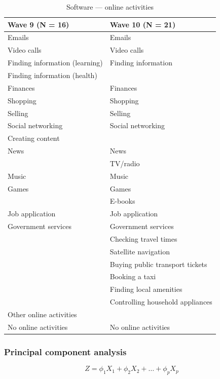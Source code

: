\begin{table}[h!]
    \centering
    \caption{Software --- online activities}
    \label{tab:software}
    \begin{tabular}{ll}
        \toprule
        Wave 9 (N = 16) & Wave 10 (N = 21) \\
        \midrule
        Emails & Emails \\
        Video calls & Video calls \\
        Finding information (learning) & Finding information \\
        Finding information (health) & \\
        Finances & Finances \\
        Shopping & Shopping \\
        Selling & Selling \\
        Social networking & Social networking \\
        Creating content & \\
        News & News \\
         & TV/radio \\
        Music & Music \\
        Games & Games \\
         & E-books \\
        Job application & Job application \\
        Government services & Government services \\
         & Checking travel times \\
         & Satellite navigation \\
         & Buying public transport tickets \\
         & Booking a taxi \\
         & Finding local amenities \\
         & Controlling household appliances \\
        Other online activities & \\
        No online activities & No online activities \\
        \bottomrule
    \end{tabular}
\end{table}

\subsubsection{Principal component analysis}


\begin{equation}
    \label{eq:pca_loadings}
    Z = \phi_{1}X_1 + \phi_{2}X_2 + \ldots + \phi_{p}X_p
\end{equation}


